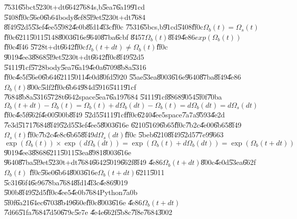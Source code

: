 \documentclass[12pt]{article}
\begin{document}
\U{7531}\U{65bc}t\U{5230}t+dt\U{6642}\U{7684}s,b\U{5ea7}\U{6a19}\U{91cd}%
\U{5408}\U{ff0c}\U{56e0}\U{6b64}body\U{8ef8}\U{5f9e}t\U{5230}t+dt\U{7684}%
\U{8f49}\U{52d5}\U{53ef}\U{4ee5}\U{5982}\U{4e0b}\U{8fd1}\U{4f3c}\U{ff0c}%
\U{7531}\U{65bc}s,b\U{91cd}\U{5408}\U{ff0c}$\Omega _{b}(t)=\Omega _{s}(t)$%
\U{ff0c}\U{6211}\U{5011}\U{5148}\U{8003}\U{616e}\U{9640}\U{87ba}\U{6cbf}%
\U{8457}$\Omega _{b}(t)$\U{8f49}\U{4e86}$exp(\Omega _{b}(t))$\U{ff0c}\U{4f46}%
\U{5728}t+dt\U{6642}\U{ff0c}$\Omega _{b}(t+dt)\neq \Omega _{b}(t)$\U{ff0c}%
\U{9019}\U{4ee3}\U{8868}\U{5f9e}t\U{5230}t+dt\U{6642}\U{ff0c}\U{8f49}\U{52d5}%
\U{5411}\U{91cf}\U{5728}body\U{5ea7}\U{6a19}\U{4e0a}\U{6709}\U{8b8a}\U{5316}%
\U{ff0c}\U{4e5f}\U{56e0}\U{6b64}\U{6211}\U{5011}\U{4e0d}\U{80fd}\U{5920}%
\U{55ae}\U{53ea}\U{8003}\U{616e}\U{9640}\U{87ba}\U{8f49}\U{4e86}$\Omega
_{b}(t)$\U{800c}\U{5df2}\U{ff0c}\U{6b64}\U{984d}\U{5916}\U{5411}\U{91cf}%
\U{7684}\U{8b8a}\U{5316}\U{5728}t\U{6642}space\U{5ea7}\U{6a19}\U{7684}%
\U{5411}\U{91cf}\U{8868}\U{9054}\U{5f0f}\U{70ba}$\Omega _{b}(t+dt)-\Omega
_{b}(t)=\Omega _{b}(t)+d\Omega _{b}(dt)-\Omega _{b}(t)=d\Omega
_{b}(dt)=d\Omega _{s}(dt)$\U{ff0c}\U{4e5f}\U{662f}\U{4e00}\U{500b}\U{8f49}%
\U{52d5}\U{5411}\U{91cf}\U{ff0c}\U{6240}\U{4ee5}space\U{7a7a}\U{9593}\U{4e2d}%
\U{7e3d}\U{5171}\U{7684}\U{8f49}\U{52d5}\U{53ef}\U{4ee5}\U{8003}\U{616e}%
\U{6210}\U{5169}\U{6b65}\U{ff0c}\U{7b2c}\U{4e00}\U{6b65}\U{8f49}$\Omega
_{s}(t)$\U{ff0c}\U{7b2c}\U{4e8c}\U{6b65}\U{8f49}$d\Omega _{s}(dt)$\U{ff0c}%
\U{5beb}\U{6210}\U{8f49}\U{52d5}\U{77e9}\U{9663}%
\begin{equation}
\exp (\Omega _{b}(t))\times \exp (d\Omega _{b}(dt))=\exp (\Omega
_{b}(t)+d\Omega _{b}(dt))=\exp (\Omega _{b}(t+dt))
\end{equation}%
\U{9019}\U{4ee3}\U{8868}\U{6211}\U{5011}\U{53ea}\U{8981}\U{8003}\U{616e}%
\U{9640}\U{87ba}\U{5f9e}t\U{5230}t+dt\U{7684}\U{6642}\U{5019}\U{662f}\U{8f49}%
\U{4e86}$\Omega _{b}(t+dt)$\U{800c}\U{4e0d}\U{53ea}\U{662f}$\Omega _{b}(t)$%
\U{ff0c}\U{56e0}\U{6b64}\U{8003}\U{616e}$\Omega _{b}(t+dt)$\U{6211}\U{5011}%
\U{5c31}\U{66f4}\U{6e96}\U{78ba}\U{7684}\U{8fd1}\U{4f3c}\U{4e86}\U{9019}%
\U{500b}\U{8f49}\U{52d5}\U{ff0c}\U{4ee5}\U{4e0b}\U{7684}Python\U{7a0b}%
\U{5f0f}\U{6a21}\U{64ec}\U{6703}\U{8b49}\U{660e}\U{ff0c}\U{8003}\U{616e}%
\U{4e86}$\Omega _{b}(t+dt)$\U{7d66}\U{51fa}\U{7684}\U{7d50}\U{679c}\U{5e7e}%
\U{4e4e}\U{662f}\U{5b8c}\U{7f8e}\U{7684}\U{3002}
\end{document}
